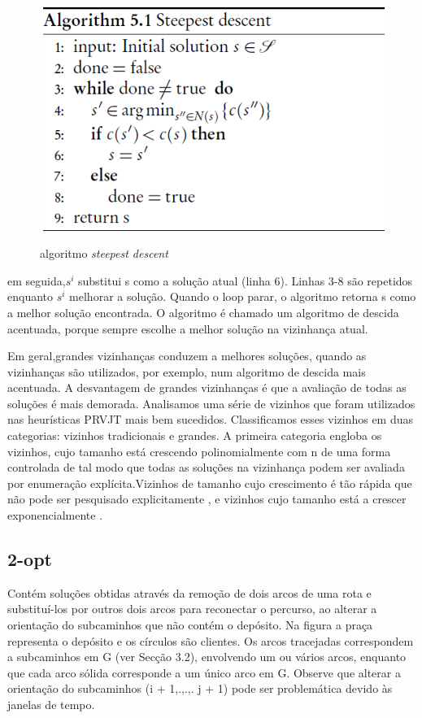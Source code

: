 \begin{figure}[ht!]
\centering
\includegraphics[scale=0.8]{figuras/alg-1.PNG}
\label{alg-1}
\caption{algoritmo \textit{steepest descent}}
\end{figure}

em seguida,$s^i$ substitui s como a solução atual (linha 6). Linhas 3-8 são repetidos enquanto $s^i$ melhorar a solução. Quando o loop parar, o algoritmo retorna s como a melhor solução encontrada. O algoritmo é chamado um algoritmo de descida acentuada, porque sempre escolhe a melhor solução na vizinhança atual.

Em geral,grandes vizinhanças conduzem a melhores soluções, quando as vizinhanças são utilizados, por exemplo, num algoritmo de descida mais acentuada. A desvantagem de grandes vizinhanças é que a avaliação de todas as soluções é mais demorada. Analisamos uma série de vizinhos que foram utilizados nas heurísticas PRVJT mais bem sucedidos. Classificamos esses vizinhos em duas categorias: vizinhos tradicionais e grandes. A primeira categoria engloba os vizinhos, cujo tamanho está crescendo polinomialmente com n de uma forma controlada de tal modo que todas as soluções na vizinhança podem ser avaliada por enumeração explícita.Vizinhos de tamanho cujo crescimento é tão rápida que não pode ser pesquisado explicitamente , e vizinhos cujo tamanho está a crescer exponencialmente \cite{ahuja00}. 

\subsection{2-opt}

Contém soluções obtidas através da remoção de dois arcos de uma rota e substituí-los por outros dois arcos para reconectar o percurso, ao alterar a orientação do subcaminhos que não contém o depósito. Na figura a praça representa o depósito e os círculos são clientes. Os arcos tracejadas correspondem a subcaminhos em G (ver Secção 3.2), envolvendo um ou vários arcos, enquanto que cada arco sólida corresponde a um único arco em G. Observe que alterar a orientação do subcaminhos (i + 1,.,.,. j + 1) pode ser problemática devido às janelas de tempo.


